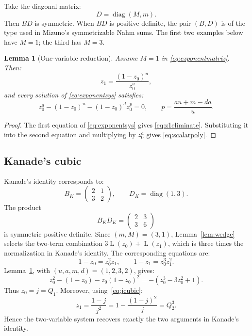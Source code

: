 \documentclass[preprint,12pt,number]{elsarticle}
\newtheorem{lemma}[theorem]{Lemma}
\theoremstyle{remark}
\newcommand{\Lr}{\operatorname{L}}
\begin{document}
\noindent Take the diagonal matrix:
\begin{equation}\label{eq:symmetrizergeneral}
D=\operatorname{diag}(M,m).
\end{equation}
Then $BD$ is symmetric.  When $BD$ is positive definite, the pair $(B,D)$
is of the type used in Mizuno's symmetrizable Nahm sums.  The first two
examples below have $M=1$; the third has $M=3$.

\begin{lemma}[One-variable reduction]\label{lem:exponentreduce}
Assume $M=1$ in \eqref{eq:exponentmatrix}.  Then:
\begin{equation}\label{eq:z1eliminate}
z_1=\frac{(1-z_0)^u}{z_0^a},
\end{equation}
and every solution of \eqref{eq:exponentsys} satisfies:
\begin{equation}\label{eq:scalarpoly}
z_0^a-(1-z_0)^u-(1-z_0)^d z_0^p=0,
\qquad
p=\frac{au+m-da}{u}.
\end{equation}
\end{lemma}

\begin{proof}
The first equation of \eqref{eq:exponentsys} gives
\eqref{eq:z1eliminate}.  Substituting it into the second equation and
multiplying by $z_0^a$ gives \eqref{eq:scalarpoly}.
\end{proof}

\subsection{Kanade's cubic}

\noindent Kanade's identity corresponds to:
\begin{equation}\label{eq:BK}
B_K=\begin{pmatrix}2&1\\3&2\end{pmatrix},\qquad
D_K=\operatorname{diag}(1,3).
\end{equation}
The product
\[
B_KD_K=\begin{pmatrix}2&3\\3&6\end{pmatrix}
\]
is symmetric positive definite.  Since $(m,M)=(3,1)$, Lemma~\ref{lem:wedge}
selects the two-term combination $3\Lr(z_0)+\Lr(z_1)$, which is three times
the normalization in Kanade's identity.  The corresponding equations are:
\begin{equation}\label{eq:Kanadeexponentsys}
1-z_0=z_0^2z_1,\qquad
1-z_1=z_0^3z_1^2.
\end{equation}
Lemma~\ref{lem:exponentreduce}, with $(u,a,m,d)=(1,2,3,2)$, gives:
\[
z_0^2-(1-z_0)-z_0(1-z_0)^2
=-(z_0^3-3z_0^2+1).
\]
Thus $z_0=j=Q_1$.  Moreover, using~\eqref{eq:jcubic}:
\[
z_1=\frac{1-j}{j^2}=1-\frac{(1-j)^2}{j}=Q_2^3.
\]
Hence the two-variable system recovers exactly the two arguments in
Kanade's identity.
\end{document}
